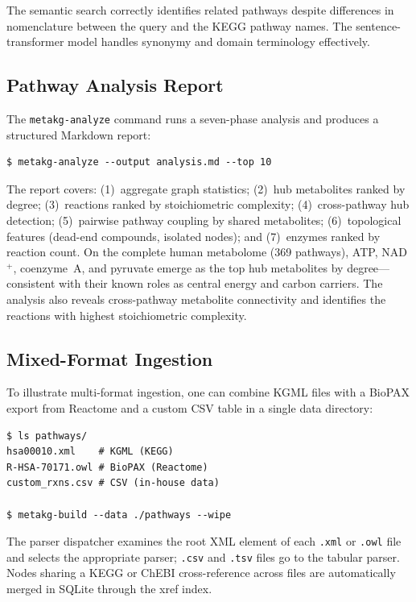 \documentclass[10pt]{article}
\begin{document}
The semantic search correctly identifies related pathways despite differences
in nomenclature between the query and the KEGG pathway names. The
sentence-transformer model handles synonymy and domain terminology effectively.

\subsection{Pathway Analysis Report}

The \texttt{metakg-analyze} command runs a seven-phase analysis and produces a
structured Markdown report:

\begin{lstlisting}[style=bash]
$ metakg-analyze --output analysis.md --top 10
\end{lstlisting}

The report covers: (1)~aggregate graph statistics; (2)~hub metabolites ranked
by degree; (3)~reactions ranked by stoichiometric complexity;
(4)~cross-pathway hub detection; (5)~pairwise pathway coupling by shared
metabolites; (6)~topological features (dead-end compounds, isolated nodes);
and (7)~enzymes ranked by reaction count. On the complete human metabolome
(369 pathways), ATP, NAD$^{+}$, coenzyme~A, and pyruvate emerge as the top
hub metabolites by degree---consistent with their known roles as central
energy and carbon carriers. The analysis also reveals cross-pathway metabolite
connectivity and identifies the reactions with highest stoichiometric
complexity.

\subsection{Mixed-Format Ingestion}

To illustrate multi-format ingestion, one can combine KGML files with a
BioPAX export from Reactome and a custom CSV table in a single data directory:

\begin{lstlisting}[style=bash]
$ ls pathways/
hsa00010.xml    # KGML (KEGG)
R-HSA-70171.owl # BioPAX (Reactome)
custom_rxns.csv # CSV (in-house data)

$ metakg-build --data ./pathways --wipe
\end{lstlisting}

The parser dispatcher examines the root XML element of each \texttt{.xml} or
\texttt{.owl} file and selects the appropriate parser; \texttt{.csv} and
\texttt{.tsv} files go to the tabular parser. Nodes sharing a KEGG or ChEBI
cross-reference across files are automatically merged in SQLite through the
xref index.
\end{document}
